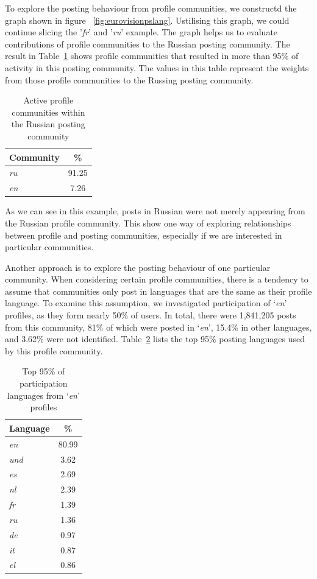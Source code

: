To explore the posting behaviour from profile communities, we constructd the graph shown
in figure ~\ref{fig:eurovisionpslang}. Ustilising this graph, we could continue slicing the '{\emph{fr}}' and '{\emph{ru}}' example.
The graph helps us to evaluate contributions of profile communities to the Russian posting community.
The result in Table~\ref{tbl:russian} shows profile communities that resulted 
in more than 95\% of activity in this posting community. The values in this table represent
the weights from those profile communities to the Russing posting community.

\begin{table}[!htb]
\centering
\begin{tabular}{@{}lc}
\toprule
\textbf{Community} & \textbf{\%} \\ 
\midrule
{\emph{ru}} & 91.25 \\
{\emph{en}} & 7.26 \\
\bottomrule
\end{tabular}
\caption{Active profile communities within the Russian posting community}
\label{tbl:russian}
\end{table}

As we can see in this example, posts in Russian were not merely
appearing from the Russian profile community. This show one way of
exploring relationships between profile and posting communities,
especially if we are interested in particular communities.

Another approach is to explore the posting behaviour of one particular
community. When considering certain profile communities, there is a
tendency to assume that communities only post in languages that are
the same as their profile language. To examine this assumption, we
investigated participation of `{\emph{en}}' profiles, as they form
nearly 50\% of users. In total, there were 1,841,205 posts from this
community, 81\% of which were posted in `{\emph{en}}', 15.4\% in other
languages, and 3.62\% were not identified. Table~\ref{tbl:enpartlangs}
lists the top 95\% posting languages used by this profile community.

\begin{table}[!htb]
\centering
\begin{tabular}{@{}lc}
\toprule
\textbf{Language} & \textbf{\%} \\ 
\midrule
{\emph{en}} & 80.99 \\
{\emph{und}} & 3.62 \\
{\emph{es}} & 2.69 \\
{\emph{nl}} & 2.39 \\
{\emph{fr}} & 1.39 \\
{\emph{ru}} & 1.36 \\
{\emph{de}} & 0.97 \\
{\emph{it}} & 0.87 \\ 
{\emph{el}} & 0.86 \\ 
\bottomrule
\end{tabular}
\caption{Top 95\% of participation languages from `{\emph{en}}' profiles}
\label{tbl:enpartlangs}
\end{table}

